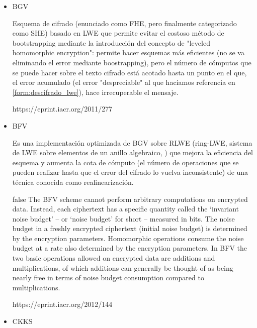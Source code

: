 \begin{itemize}

    \item BGV

    Esquema de cifrado (enunciado como FHE, pero finalmente categorizado como SHE) basado en LWE que permite evitar el costoso método de bootstrapping mediante la introducción del concepto de "leveled homomorphic encryption": permite hacer esquemas más eficientes (no se va eliminando el error mediante boostrapping), pero el número de cómputos que se puede hacer sobre el texto cifrado está acotado hasta un punto en el que, el error acumulado (el error "despreciable" al que hacíamos referencia en \ref{form:descifrado_lwe}), hace irrecuperable el mensaje.


    https://eprint.iacr.org/2011/277

    \item BFV

    Es una implementación optimizada de BGV sobre RLWE (ring-LWE, sistema de LWE sobre elementos de un anillo algebraico, \cite{wikipedia_contributors._anillo_2019}) que mejora la eficiencia del esquema y aumenta la cota de cómputo (el número de operaciones que se pueden realizar hasta que el error del cifrado lo vuelva inconsistente) de una técnica conocida como realinearización.

    \if false
    The BFV scheme cannot perform arbitrary computations on encrypted data.
        Instead, each ciphertext has a specific quantity called the `invariant noise
        budget' -- or `noise budget' for short -- measured in bits. The noise budget
        in a freshly encrypted ciphertext (initial noise budget) is determined by
        the encryption parameters. Homomorphic operations consume the noise budget
        at a rate also determined by the encryption parameters. In BFV the two basic
        operations allowed on encrypted data are additions and multiplications, of
        which additions can generally be thought of as being nearly free in terms of
        noise budget consumption compared to multiplications.
    \fi

    https://eprint.iacr.org/2012/144


    \item CKKS


\end{itemize}
